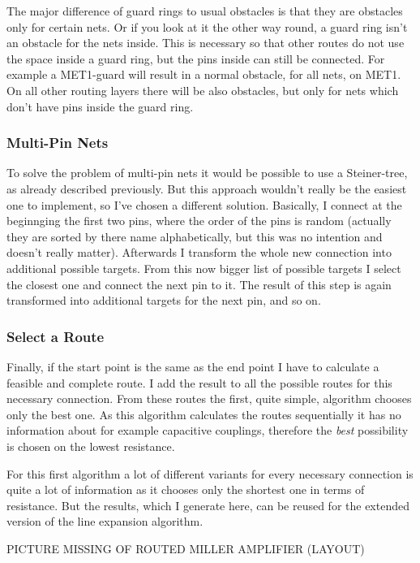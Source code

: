 The major difference of guard rings to usual obstacles is that they are obstacles only for certain nets. Or if you look at it the other way round, a guard ring isn't an obstacle for the nets inside. This is necessary so that other routes do not use the space inside a guard ring, but the pins inside can still be connected. For example a MET1-guard will result in a normal obstacle, for all nets, on MET1. On all other routing layers there will be also obstacles, but only for nets which don't have pins inside the guard ring.

\subsubsection{Multi-Pin Nets}
To solve the problem of multi-pin nets it would be possible to use a Steiner-tree, as already described previously. But this approach wouldn't really be the easiest one to implement, so I've chosen a different solution. Basically, I connect at the beginnging the first two pins, where the order of the pins is random (actually they are sorted by there name alphabetically, but this was no intention and doesn't really matter). Afterwards I transform the whole new connection into additional possible targets. From this now bigger list of possible targets I select the closest one and connect the next pin to it. The result of this step is again transformed into additional targets for the next pin, and so on.

\subsubsection{Select a Route}
Finally, if the start point is the same as the end point I have to calculate a feasible and complete route. I add the result to all the possible routes for this necessary connection. From these routes the first, quite simple, algorithm chooses only the best one. As this algorithm calculates the routes sequentially it has no information about for example capacitive couplings, therefore the \emph{best} possibility is chosen on the lowest resistance.

For this first algorithm a lot of different variants for every necessary connection is quite a lot of information as it chooses only the shortest one in terms of resistance. But the results, which I generate here, can be reused for the extended version of the line expansion algorithm.

PICTURE MISSING OF ROUTED MILLER AMPLIFIER (LAYOUT)

